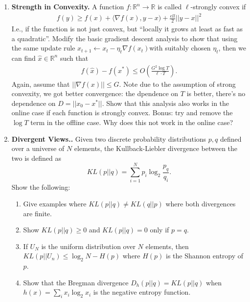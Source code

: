 \documentclass{article}
\theoremstyle{plain}
\newcommand{\R}{\mathbb{R}}
\newcommand\litem[1]{\item{\bfseries#1.\space}}
\begin{document}
\begin{enumerate}
\begin{enumerate}
\item Define an appropriate “easy” polytope $K$ for this problem.
  \item  Given weights $q \in \Delta^m$, how would you solve the oracle for this problem? Show you can
find a flow that satisfies the demands, but uses at most $(1 + \epsilon)$ capacity on each edge in time $\frac{O(k(m+n \ln n ))}{\poly(\epsilon)} \cdot \left(\sum_i F_i\right) = \frac{O(km(m+n\ln n))}{\poly(\epsilon)}$. 
\end{enumerate}
\litem{Strength in Convexity} A function $f : \R^n \to \R$ is called $\ell$-strongly convex if
\begin{align*}
f ( y ) \geq f ( x ) + \langle \nabla f ( x ) ,y - x ) + \frac {ell } { 2} | | y - x | | ^ { 2}
\end{align*}
%
I.e., if the function is not just convex, but “locally it grows at least as fast as a quadratic”.
Modify the basic gradient descent analysis to show that using the same update rule $x_{t+1}\gets
x_t − \eta_t \nabla f(x_t) $with suitably chosen $\eta_t$, then we can find $\hat{x}\in \R^n$
such that
\begin{align*}
f ( \hat { x } ) - f ( x ^ { * } ) \leq O ( \frac { G ^ { 2} \log T } { \ell \cdot T } ).
\end{align*}
Again, assume that $||\nabla f(x)|| \leq G$. Note due to the
assumption of strong convexity, we got better convergence: the
dpendence on $T$ is better, there's no dependence on
$D = ||x_0 - x^*||$. Show that this analysis also works in the online
case if each function is strongly convex. Bonus: try and remove the
$\log T$ term in the offline case. Why does this not work in the
online case?
\litem{Divergent Views.} Given two discrete probability distributions $p, q$ defined over a universe of $N$ elements, the Kullback-Liebler divergence between the two is defined as
\[KL(p || q) = \sum_{i = 1}^N p_i \log_2 \frac{p_q}{q_i}.\]
%
Show the following:
\begin{enumerate}
\item Give examples where $KL(p || q)\neq KL(q || p)$ where both divergences are finite.
\item Show $KL(p || q) \geq 0$ and $KL(p || q) = 0$ only if $p =q $.
\item If $U_N$ is the uniform distribution over $N$ elements, then $KL(p || U_n) \leq \log_2 N - H(p)$ where $H(p)$ is the Shannon entropy of $p$.
\item Show that the Bregman divergence $D_h(p || q) = KL(p||q)$ when $h(x)= \sum_i x_i \log_2 x_i$ is the negative entropy function.

\end{enumerate}
\end{enumerate}
\end{document}
